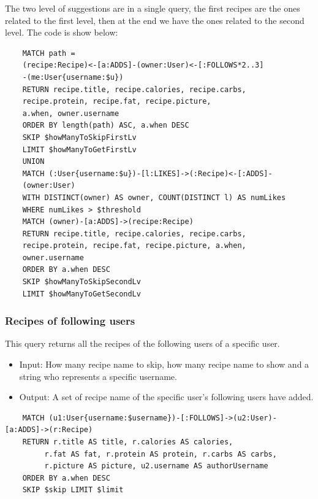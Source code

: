 \documentclass[a4paper]{report}
\begin{document}
\noindent The two level of suggestions are in a single query, the first recipes are the ones related to the first level, then at the end we have the ones related to the second level. The code is show below:

\begin{lstlisting}
	MATCH path =
	(recipe:Recipe)<-[a:ADDS]-(owner:User)<-[:FOLLOWS*2..3]
	-(me:User{username:$u})
	RETURN recipe.title, recipe.calories, recipe.carbs,
	recipe.protein, recipe.fat, recipe.picture,
	a.when, owner.username
	ORDER BY length(path) ASC, a.when DESC
	SKIP $howManyToSkipFirstLv
	LIMIT $howManyToGetFirstLv
	UNION
	MATCH (:User{username:$u})-[l:LIKES]->(:Recipe)<-[:ADDS]-
	(owner:User)
	WITH DISTINCT(owner) AS owner, COUNT(DISTINCT l) AS numLikes
	WHERE numLikes > $threshold
	MATCH (owner)-[a:ADDS]->(recipe:Recipe)
	RETURN recipe.title, recipe.calories, recipe.carbs,
	recipe.protein, recipe.fat, recipe.picture, a.when,
	owner.username
	ORDER BY a.when DESC
	SKIP $howManyToSkipSecondLv
	LIMIT $howManyToGetSecondLv	
\end{lstlisting}

\subsubsection{Recipes of following users}
This query returns all the recipes of the following users of a specific user.
\begin{itemize}
	\item Input: How many recipe name to skip, how many recipe name to show and a string who represents a specific username.
	\item Output: A set of recipe name of the specific user's following users have added.
\end{itemize}
\lstset{ language=java}
\begin{lstlisting}
	MATCH (u1:User{username:$username})-[:FOLLOWS]->(u2:User)-[a:ADDS]->(r:Recipe)
	RETURN r.title AS title, r.calories AS calories,
		 r.fat AS fat, r.protein AS protein, r.carbs AS carbs,
		 r.picture AS picture, u2.username AS authorUsername 
	ORDER BY a.when DESC 
	SKIP $skip LIMIT $limit
\end{lstlisting}
\end{document}
